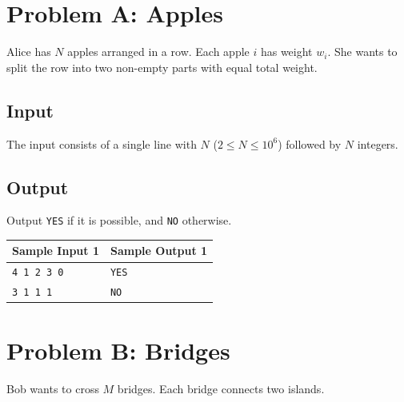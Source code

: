 \documentclass[11pt]{article}
\begin{document}
\section*{Problem A: Apples}
Alice has $N$ apples arranged in a row. Each apple $i$ has weight $w_i$. She wants to split the row
into two non-empty parts with equal total weight.

\subsection*{Input}
The input consists of a single line with $N$ ($2 \le N \le 10^6$) followed by $N$ integers.

\subsection*{Output}
Output \texttt{YES} if it is possible, and \texttt{NO} otherwise.

\begin{tabular}{|p{6cm}|p{6cm}|}
\hline
Sample Input 1 & Sample Output 1 \\
\hline
\texttt{4 1 2 3 0} & \texttt{YES} \\
\hline
\texttt{3 1 1 1} & \texttt{NO} \\
\hline
\end{tabular}
\newpage
\section*{Problem B: Bridges}
Bob wants to cross $M$ bridges. Each bridge connects two islands.
\end{document}
